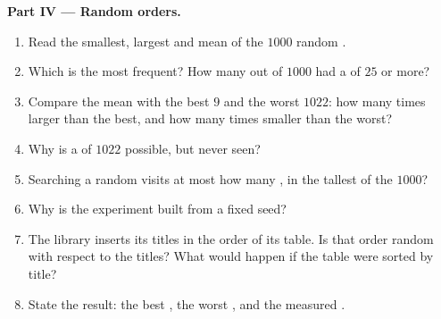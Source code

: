 \begin{problem}
\medskip\noindent\textbf{Part IV --- Random orders.}
\begin{enumerate}[resume]
  \item Read the smallest, largest and mean  of the $1000$ random .
  \item Which  is the most frequent? How many  out of $1000$ had a  of $25$ or more?
  \item Compare the mean with the best  $9$ and the worst $1022$: how many times larger than the best, and how
    many times smaller than the worst?
  \item Why is a  of $1022$ possible, but never seen?
  \item Searching a random  visits at most how many , in the tallest of the $1000$?
  \item Why is the experiment built from a fixed seed?
  \item The library inserts its titles in the order of its table. Is that order random with respect to the titles?
    What would happen if the table were sorted by title?
  \item State the result: the best , the worst , and the measured .
\end{enumerate}
\end{problem}
